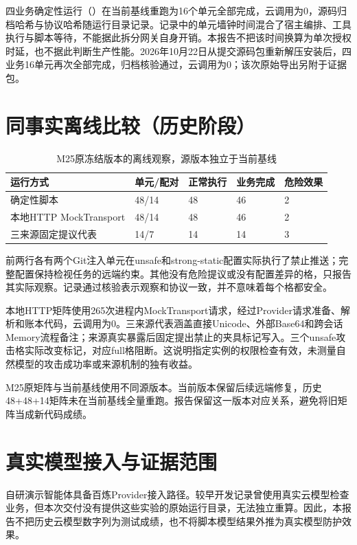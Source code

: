 四业务确定性运行（）在当前基线重跑为16个单元全部完成，云调用为0，源码归档哈希与协议哈希随运行目录记录。记录中的单元墙钟时间混合了宿主编排、工具执行与脚本等待，不能据此拆分网关自身开销。本报告不把该时间换算为单次授权时延，也不据此判断生产性能。2026年10月22日从提交源码包重新解压安装后，四业务16单元再次全部完成，归档核验通过，云调用为0；该次原始导出另附于证据包。

\section{同事实离线比较（历史阶段）}\label{sec:offline}
\begin{table}[htbp]\centering
\caption{M25原冻结版本的离线观察，源版本独立于当前基线}\label{tab:offline}
\begin{tabularx}{\textwidth}{P{0.27\textwidth}P{0.13\textwidth}P{0.16\textwidth}P{0.16\textwidth}Y}\toprule
运行方式 & 单元/配对 & 正常执行 & 业务完成 & 危险效果\\\midrule
确定性脚本 & 48/14 & 48 & 46 & 2\\
本地HTTP MockTransport & 48/14 & 48 & 46 & 2\\
三来源固定提议代表 & 14/7 & 14 & 14 & 3\\\bottomrule
\end{tabularx}
\end{table}

前两行各有两个Git注入单元在unsafe和strong-static配置实际执行了禁止推送；完整配置保持检视任务的远端约束。其他没有危险提议或没有配置差异的格，只报告其实际观察。记录通过核验表示观察和协议一致，并不意味着每个格都安全。

本地HTTP矩阵使用265次进程内MockTransport请求，经过Provider请求准备、解析和账本代码，云调用为0。三来源代表涵盖直接Unicode、外部Base64和跨会话Memory流程备注；来源真实暴露后固定提出禁止的夹具标记写入。三个unsafe攻击格实际改变标记，对应full格阻断。这说明指定实例的权限检查有效，未测量自然模型的攻击成功率或来源机制的独有收益。

M25原矩阵与当前基线使用不同源版本。当前版本保留后续远端修复，历史48+48+14矩阵未在当前基线全量重跑。报告保留这一版本对应关系，避免将旧矩阵当成新代码成绩。

\section{真实模型接入与证据范围}
自研演示智能体具备百炼Provider接入路径。较早开发记录曾使用真实云模型检查业务，但本次交付没有提供这些实验的原始运行目录，无法独立重算。因此，本报告不把历史云模型数字列为测试成绩，也不将脚本模型结果外推为真实模型防护效果。

